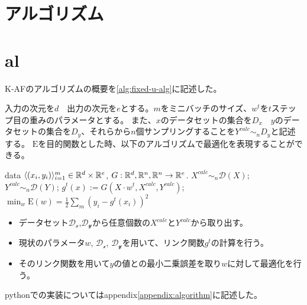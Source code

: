 \section{アルゴリズム}
\section{al}
K-AFのアルゴリズムの概要を\ref{alg:fixed-u-alg}に記述した。

入力の次元を$ d $　出力の次元を$ e $とする。$ m $をミニバッチのサイズ、$ w^t $を$t$ステップ目の重みのパラメータとする。
また、$x$のデータセットの集合を$ D_x $　$y$のデータセットの集合を$ D_y $、それらから$n$個サンプリングすることを$ Y^{calc} \sim_n D_y $と記述する。
$ \mathrm{E} $を目的関数とした時、以下のアルゴリズムで最適化を表現することができる。



\begin{algorithm}[]
	\caption{\KAF}
	\label{alg:fixed-u-alg}
\begin{algorithmic}
	 data $\langle (x_i, y_i) \rangle_{i=1}^m \in
	\mathbb{R}^d \times \mathbb{R}^e$, $G: \mathbb{R}^d, \mathbb{R}^n, \mathbb{R}^n \rightarrow  \mathbb{R}^e$.
	\STATE $X^{calc} \sim_n \mathcal{D}(X)$;
    \STATE $Y^{calc} \sim_n \mathcal{D}(Y)$;
	\STATE $g^t(x) := G(X \cdot w^t, X^{calc}, Y^{calc} )$;
	\STATE $ \displaystyle{\min_{w} \mathrm{E}(w)} = \frac{1}{2}\sum_m (y_i - g^t(x_i))^2 $
	\ENDFOR
\end{algorithmic}
\end{algorithm}

\begin{itemize}
  \item データセット$\mathcal{D_x}$,$\mathcal{D_y}$から任意個数の$ X^{calc} $と$ Y^{calc} $から取り出す。
  \item 現状のパラメータ$ w $, $\mathcal{D_x}$, $\mathcal{D_y}$を用いて、リンク関数$ g^t $の計算を行う。
  \item そのリンク関数を用いて$ y $の値との最小二乗誤差を取り$ w $に対して最適化を行う。
\end{itemize}


pythonでの実装についてはappendix\ref{appendix:algorithm}に記述した。






